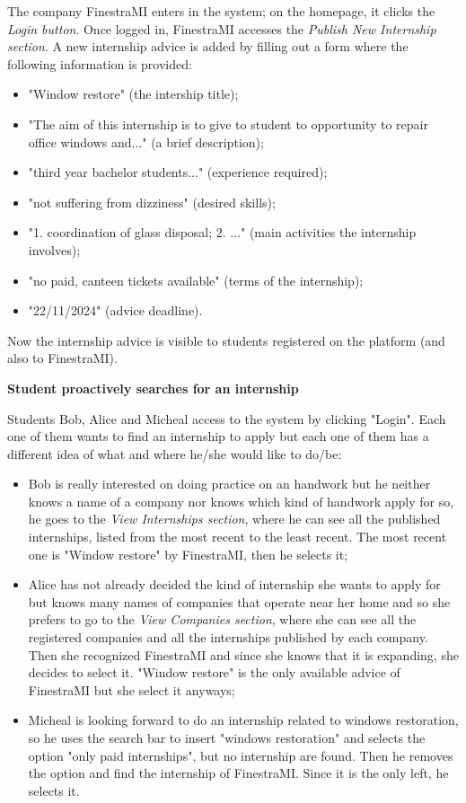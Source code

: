 			\begin{flushleft}
				The company FinestraMI enters in the system; on the homepage, it clicks the \emph{Login button}. Once logged in, FinestraMI accesses the \emph{Publish New Internship section}. A new internship advice is added by filling out a form where the following information is provided:
				\begin{itemize}
					\item "Window restore" (the intership title);
					\item "The aim of this internship is to give to student to opportunity to repair office windows and..." (a brief description);
					\item "third year bachelor students..." (experience required);
					\item "not suffering from dizziness" (desired skills);
					\item "1. coordination of glass disposal; 2. ..." (main activities the internship involves);
					\item "no paid, canteen tickets available" (terms of the internship);
					\item "22/11/2024" (advice deadline).
				\end{itemize}
				
				Now the internship advice is visible to students registered on the platform (and also to FinestraMI).
			\end{flushleft}
			\textbf{Student proactively searches for an internship}
			\begin{flushleft}
				Students Bob, Alice and Micheal access to the system by clicking "Login". Each one of them wants to find an internship to apply but each one of them has a different idea of what and where he/she would like to do/be:
				\begin{itemize}
					\item Bob is really interested on doing practice on an handwork but he neither knows a name of a company nor knows which kind of handwork apply for so, he goes to the \emph{View Internships section}, where he can see all the published internships, listed from the most recent to the least recent. The most recent one is "Window restore" by FinestraMI, then he selects it;
					\item Alice has not already decided the kind of internship she wants to apply for but knows many names of companies that operate near her home and so she prefers to go to the \emph{View Companies section}, where she can see all the registered companies and all the internships published by each company. Then she recognized FinestraMI and since she knows that it is expanding, she decides to select it. "Window restore" is the only available advice of FinestraMI but she select it anyways;
					\item Micheal is looking forward to do an internship related to windows restoration, so he uses the search bar to insert "windows restoration" and selects the option "only paid internships", but no internship are found. Then he removes the option and find the internship of FinestraMI. Since it is the only left, he selects it.
				\end{itemize} 
			\end{flushleft}
